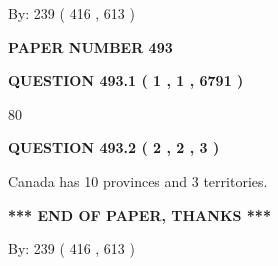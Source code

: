 \documentclass[12pt]{article}
\begin{document}
   
\hspace{1.0in} By: 
 239 ( 416 ,  613 )
   
   
   
   
\newpage 
\setcounter{page}{ 
   493001 } 
   
   
   
   
 {\textbf{ \Large{ PAPER NUMBER  493  }}}
   
   
\vspace{0.2in}
   
   
   
   
   
   
 \vspace{0.2in}
 
 
 
 
   
   
  
\vspace{0.2in}
  
{\textbf{\Large{QUESTION
493.1 
 ( 1 , 1 , 6791 )
}}}
  
  
 
 
\noindent{}

80
 
 
  
\vspace{0.2in}
  
{\textbf{\Large{QUESTION
493.2 
 ( 2 , 2 , 3 )
}}}
  
  
 
 
\noindent{}
 
 
Canada has 10  provinces and 3 territories.
 
 
 
 
   
   
 \vspace{0.2in}
 
   
   
   
   
\vspace{1.0in} 
{\textbf{\large{ *** END OF PAPER, THANKS *** }}} 
   
   
\hspace{1.0in} By: 
 239 ( 416 ,  613 )
   
   
   
   
\newpage 
\setcounter{page}{ 
   494001 } 
   
\end{document}
